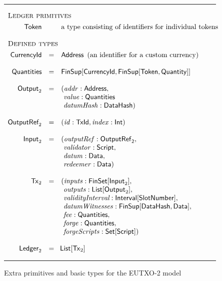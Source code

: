 \documentclass[a4paper]{article}
\renewcommand{\i}{\textit}  %
\newcommand{\s}{\textsf}  %
\newcommand{\msf}[1]{\ensuremath{\mathsf{#1}}}
\newcommand{\mi}[1]{\ensuremath{\mathit{#1}}}
\newcommand\rfskip{7pt}
\newenvironment{ruledfigure}[1]{\begin{figure}[#1]\hrule\vspace{\rfskip}}{\vspace{\rfskip}\hrule\end{figure}}
\newcommand{\List}[1]{\ensuremath{\s{List}[#1]}}
\newcommand{\Set}[1]{\ensuremath{\s{Set}[#1]}}
\newcommand{\FinSet}[1]{\ensuremath{\s{FinSet}[#1]}}
\newcommand{\Interval}[1]{\ensuremath{\s{Interval}[#1]}}
\newcommand{\FinSup}[2]{\ensuremath{\s{FinSup}[#1,#2]}}
\newcommand{\script}{\ensuremath{\s{Script}}}
\newcommand{\TxId}{\ensuremath{\s{TxId}}}
\newcommand{\txrefid}{\mi{id}}
\newcommand{\Address}{\ensuremath{\s{Address}}}
\newcommand{\DataHash}{\ensuremath{\s{DataHash}}}
\newcommand{\idx}{\mi{index}}
\newcommand{\inputs}{\mi{inputs}}
\newcommand{\outputs}{\mi{outputs}}
\newcommand{\forge}{\mi{forge}}
\newcommand{\forgeScripts}{\mi{forgeScripts}}
\newcommand{\fee}{\mi{fee}}
\newcommand{\addr}{\mi{addr}}
\newcommand{\val}{\mi{value}}  %
\newcommand{\validator}{\mi{validator}}
\newcommand{\redeemer}{\mi{redeemer}}
\newcommand{\datum}{\mi{datum}}
\newcommand{\datumHash}{\mi{datumHash}}
\newcommand{\datumWits}{\mi{datumWitnesses}}
\newcommand{\Data}{\ensuremath{\s{Data}}}
\newcommand{\outputref}{\mi{outputRef}}
\newcommand{\slotnum}{\ensuremath{\s{SlotNumber}}}
\newcommand{\eutxotx}{\msf{Tx}}
\newcommand{\qty}{\ensuremath{\s{Quantity}}}
\newcommand{\token}{\ensuremath{\s{Token}}}
\newcommand{\currency}{\ensuremath{\s{CurrencyId}}}
\newcommand{\qtymap}{\ensuremath{\s{Quantities}}}
\begin{document}
\begin{ruledfigure}{H}
  \begin{displaymath}
    \begin{array}{rll}
      \multicolumn{3}{l}{\textsc{Ledger primitives}}\\[4pt]
    \token     && \mbox{a type consisting of identifiers for individual tokens}\\
    \\
    
    \multicolumn{3}{l}{\textsc{Defined types}}\\[4pt]
    \currency  &=& \Address \enspace\mbox{(an identifier for a custom currency)}\\
    \\
    \qtymap   &=& \FinSup{\currency}{\FinSup{\token}{\qty}}\\
    \\
    \s{Output}_2 &=&(\addr: \Address,\\
                 & &\ \val: \qtymap\\
                 & &\ \datumHash: \DataHash)\\
    \\
    \s{OutputRef}_2 &= &(\txrefid: \TxId, \idx: \s{Int})\\
    \\
    \s{Input}_2 &=&( \outputref: \sf{OutputRef}_2,\\
                & &\ \validator: \script,\\
                & &\ \datum: \Data,\\
                & &\ \redeemer: \Data)\\
    \\
    \eutxotx_2 &=&(\inputs: \FinSet{\s{Input}_2},\\
               & &\ \outputs: \List{\s{Output}_2},\\
               & &\ \i{validityInterval}: \Interval{\slotnum},\\
               & &\ \datumWits: \FinSup{\DataHash}{\Data},\\
               & &\ \fee: \qtymap,\\
               & &\ \forge: \qtymap,\\
               & &\ \forgeScripts: \Set{\script})\\
    \\
    \s{Ledger}_2 &=&\!\List{\eutxotx_2}\\
    \end{array}
  \end{displaymath}
  \caption{Extra primitives and basic types for the EUTXO-2 model}
  \label{fig:eutxo-2-types}
\end{ruledfigure}
\end{document}
